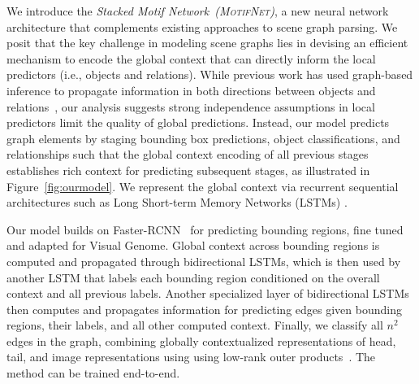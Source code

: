 \documentclass[10pt,twocolumn,letterpaper]{article}
\newcommand{\model}{\textsc{MotifNet}}
\newcommand{\modellong}{Stacked Motif Network}
\newcommand{\term}[1]{\emph{#1}}  %
\begin{document}
We introduce the \term{\modellong~(\model)}, a new neural network architecture
that complements existing approaches to scene graph parsing.
We posit that the key challenge in modeling scene graphs lies in devising an efficient mechanism to encode the global context that can directly inform the local predictors (i.e., objects and relations).
While previous work has used graph-based inference to propagate information in both directions between objects and relations~\cite{xu_scene_2017, li2017msdn, li_vip-cnn:_2017}, our analysis suggests strong independence assumptions in local predictors limit the quality of global predictions. %
Instead, our model predicts graph elements by staging bounding box predictions, object classifications, and relationships such that the global context encoding of all previous stages establishes rich context for predicting subsequent stages, as illustrated in Figure~\ref{fig:ourmodel}.
We represent %
the global context via recurrent sequential architectures such as Long Short-term Memory Networks (LSTMs) \cite{Hochreiter:1997:LSM:1246443.1246450}.

Our model builds on Faster-RCNN~\cite{ren_faster_2015}  for predicting bounding regions, fine tuned and adapted for Visual Genome.
Global context across bounding regions is computed and propagated through bidirectional LSTMs, which is then used by another LSTM that labels each bounding region conditioned on the overall context and all previous labels.
Another specialized layer of bidirectional LSTMs then computes and propagates information for predicting edges given bounding regions, their labels, and all other computed context.
Finally, we classify all $n^2$ edges in the graph, combining globally %
contextualized representations of head, tail, and image representations using using low-rank outer products~\cite{Kim2016HadamardPF}.
The method can be trained end-to-end.
\end{document}

